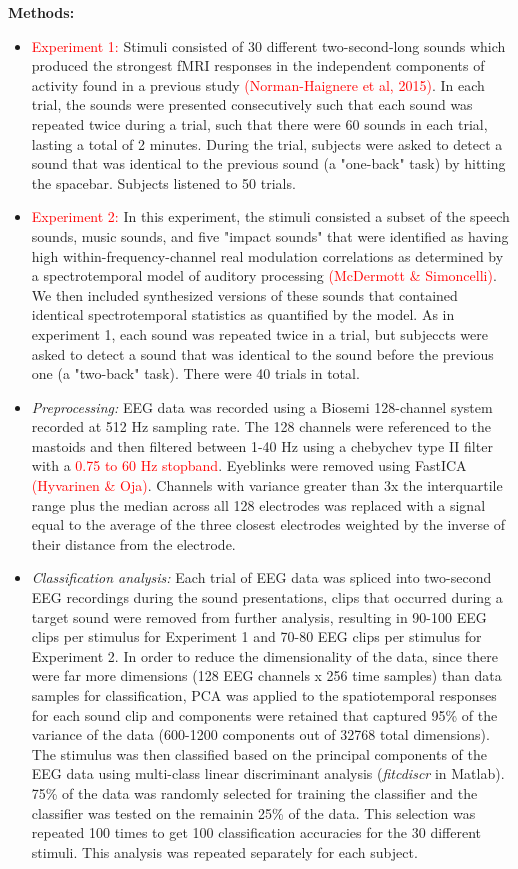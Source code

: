 \documentclass[11pt]{article}
\begin{document}
\textbf{Methods:}
\begin{itemize}
\item \textcolor{red}{Experiment 1:} Stimuli consisted of 30 different two-second-long sounds which produced the strongest fMRI responses in the independent components of activity found in a previous study \textcolor{red}{(Norman-Haignere et al, 2015)}.  In each trial, the sounds were presented consecutively such that each sound was repeated twice during a trial, such that there were 60 sounds in each trial, lasting a total of 2 minutes.  During the trial, subjects were asked to detect a sound that was identical to the previous sound (a "one-back" task) by hitting the spacebar.  Subjects listened to 50 trials.
\item \textcolor{red}{Experiment 2:} In this experiment, the stimuli consisted a subset of the speech sounds, music sounds, and five "impact sounds" that were identified as having high within-frequency-channel real modulation correlations as determined by a spectrotemporal model of auditory processing \textcolor{red}{(McDermott \& Simoncelli)}.  We then included synthesized versions of these sounds that contained identical spectrotemporal statistics as quantified by the model.  As in experiment 1, each sound was repeated twice in a trial, but subjeccts were asked to detect a sound that was identical to the sound before the previous one (a "two-back" task). There were 40 trials in total.
\item \textit{Preprocessing:} EEG data was recorded using a Biosemi 128-channel system recorded at 512 Hz sampling rate.  The 128 channels were referenced to the mastoids and then filtered between 1-40 Hz using a chebychev type II filter with a \textcolor{red}{0.75 to 60 Hz stopband}.  Eyeblinks were removed using FastICA \textcolor{red}{(Hyvarinen \& Oja)}.  Channels with variance greater than 3x the interquartile range plus the median across all 128 electrodes was replaced with a signal equal to the average of the three closest electrodes weighted by the inverse of their distance from the electrode.
\item \textit{Classification analysis:} Each trial of EEG data was spliced into two-second EEG recordings during the sound presentations, clips that occurred during a target sound were removed from further analysis, resulting in 90-100 EEG clips per stimulus for Experiment 1 and 70-80 EEG clips per stimulus for Experiment 2.  In order to reduce the dimensionality of the data, since there were far more dimensions (128 EEG channels x 256 time samples) than data samples for classification, PCA was applied to the spatiotemporal responses for each sound clip and components were retained that captured 95\% of the variance of the data (600-1200 components out of 32768 total dimensions).  The stimulus was then classified based on the principal components of the EEG data using multi-class linear discriminant analysis (\textit{fitcdiscr} in Matlab).  75\% of the data was randomly selected for training the classifier and the classifier was tested on the remainin 25\% of the data.  This selection was repeated 100 times to get 100 classification accuracies for the 30 different stimuli.  This analysis was repeated separately for each subject.  

\end{itemize}
\end{document}
